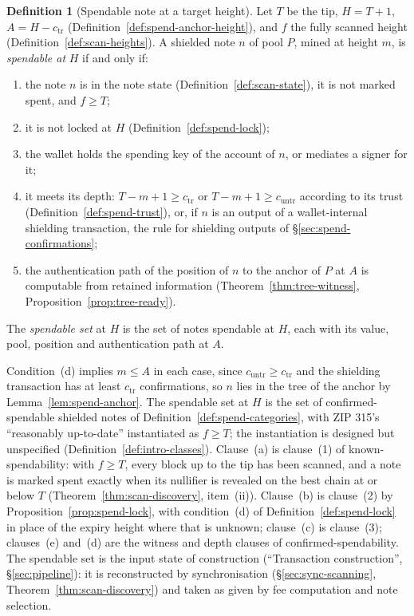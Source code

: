 \documentclass[11pt,a4paper]{article}
\theoremstyle{definition}
\newtheorem{definition}[theorem]{Definition}
\begin{document}
\begin{definition}[Spendable note at a target height]
\label{def:spend-spendable}
Let $T$ be the tip, $H = T + 1$, $A = H - c_{\mathrm{tr}}$
(Definition~\ref{def:spend-anchor-height}), and $f$ the fully scanned
height (Definition~\ref{def:scan-heights}). A shielded note $n$ of pool
$P$, mined at height $m$, is \emph{spendable at} $H$ if and only if:
\begin{enumerate}[label=(\alph*)]
\item the note $n$ is in the note state (Definition~\ref{def:scan-state}),
  it is not marked spent, and $f \ge T$;
\item it is not locked at $H$ (Definition~\ref{def:spend-lock});
\item the wallet holds the spending key of the account of $n$, or mediates a
  signer for it;
\item it meets its depth: $T - m + 1 \ge c_{\mathrm{tr}}$ or $T - m + 1 \ge
  c_{\mathrm{untr}}$ according to its trust
  (Definition~\ref{def:spend-trust}), or, if $n$ is an output of a
  wallet-internal shielding transaction, the rule for shielding outputs of
  \S\ref{sec:spend-confirmations};
\item the authentication path of the position of $n$ to the anchor of $P$
  at $A$ is computable from retained information
  (Theorem~\ref{thm:tree-witness}, Proposition~\ref{prop:tree-ready}).
\end{enumerate}
The \emph{spendable set} at $H$ is the set of notes spendable at $H$, each
with its value, pool, position and authentication path at $A$.
\end{definition}

Condition~(d) implies $m \le A$ in each case, since $c_{\mathrm{untr}} \ge
c_{\mathrm{tr}}$ and the shielding transaction has at least
$c_{\mathrm{tr}}$ confirmations, so $n$ lies in the tree of the anchor by
Lemma~\ref{lem:spend-anchor}. The spendable set at $H$ is the set of
confirmed-spendable shielded notes of Definition~\ref{def:spend-categories},
with ZIP 315's ``reasonably up-to-date'' instantiated as $f \ge T$; the
instantiation is designed but unspecified
(Definition~\ref{def:intro-classes}). Clause~(a) is clause~(1) of
known-spendability: with $f \ge T$, every block up to the tip has been
scanned, and a note is marked spent exactly when its nullifier is revealed
on the best chain at or below $T$ (Theorem~\ref{thm:scan-discovery},
item~(ii)). Clause~(b) is clause~(2) by Proposition~\ref{prop:spend-lock},
with condition~(d) of Definition~\ref{def:spend-lock} in place of the
expiry height where that is unknown; clause~(c) is clause~(3);
clauses~(e) and~(d) are the witness and depth clauses of
confirmed-spendability. The spendable set is the input state of
construction (``Transaction construction'', \S\ref{sec:pipeline}): it is
reconstructed by synchronisation (\S\ref{sec:sync-scanning},
Theorem~\ref{thm:scan-discovery}) and taken as given by fee computation and
note selection.
\end{document}
